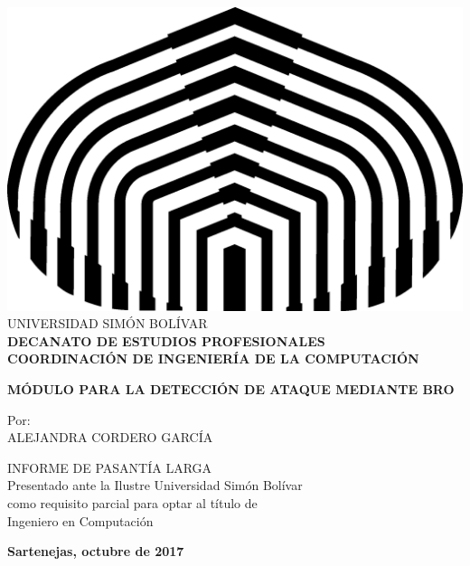 \begin{titlepage}
\begin{center}

\includegraphics[scale=0.5,type=png,ext=.png,read=.png]{./img/usb} \\

\textsc {\large UNIVERSIDAD SIMÓN BOLÍVAR} \\
\textsc{\bfseries DECANATO DE ESTUDIOS PROFESIONALES\\
COORDINACIÓN DE INGENIERÍA DE LA COMPUTACIÓN}

\bigskip
\bigskip
\bigskip
\bigskip
\bigskip
\bigskip
\bigskip
\bigskip
\bigskip

\textsc{\bfseries MÓDULO PARA LA DETECCIÓN DE ATAQUE MEDIANTE BRO}

\bigskip
\bigskip
\bigskip
\bigskip
\bigskip

\begin{minipage}{\textwidth}
\centering
Por: \\ ALEJANDRA CORDERO GARCÍA\\

\bigskip
\bigskip
\bigskip

\end{minipage}

\bigskip
\bigskip
\bigskip
\bigskip
\bigskip
\bigskip
\bigskip
\bigskip
\bigskip

{INFORME DE PASANTÍA LARGA \\ Presentado ante la Ilustre Universidad Simón Bolívar \\
como requisito parcial para optar al título de \\ Ingeniero en Computación} \\

\bigskip
\bigskip
\vfill

{\large \bfseries Sartenejas, 
octubre de 2017}

\end{center}
\end{titlepage}
